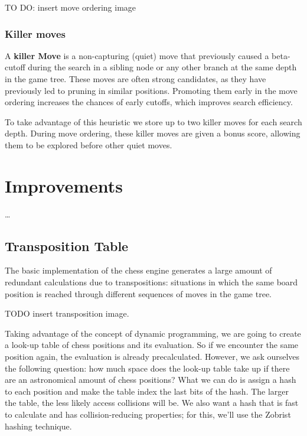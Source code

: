 \vspace{1em}

TO DO: insert move ordering image

\subsubsection{Killer moves}

A \textbf{killer Move} is a non-capturing (quiet) move that previously caused a beta-cutoff during the search in a sibling node or any other branch at the same depth in the game tree. These moves are often strong candidates, as they have previously led to pruning in similar positions. Promoting them early in the move ordering increases the chances of early cutoffs, which improves search efficiency.

To take advantage of this heuristic we store up to two killer moves for each search depth. During move ordering, these killer moves are given a bonus score, allowing them to be explored before other quiet moves.

\section{Improvements}

\ldots

\subsection{Transposition Table}

The basic implementation of the chess engine generates a large amount of redundant calculations due to transpositions: situations in which the same board position is reached through different sequences of moves in the game tree.

\vspace{1em}

TODO insert transposition image.

\vspace{1em}

\noindent Taking advantage of the concept of dynamic programming, we are going to create a look-up table of chess positions and its evaluation. So if we encounter the same position again, the evaluation is already precalculated. However, we ask ourselves the following question: how much space does the look-up table take up if there are an astronomical amount of chess positions? What we can do is assign a hash to each position and make the table index the last bits of the hash. The larger the table, the less likely access collisions will be. We also want a hash that is fast to calculate and has collision-reducing properties; for this, we'll use the Zobrist hashing technique.

